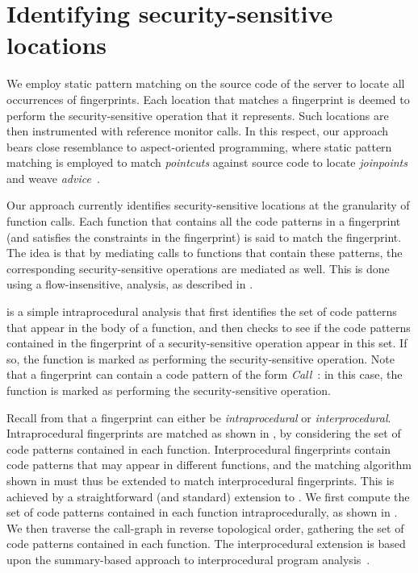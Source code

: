 \section{Identifying security-sensitive locations}
\label{chapter:matching:identifying}

We employ static pattern matching on the source code of the server to locate
all occurrences of fingerprints. Each location that matches a fingerprint is
deemed to perform the security-sensitive operation that it represents. Such
locations are then instrumented with reference monitor calls.  In this respect,
our approach bears close resemblance to aspect-oriented programming, where
static pattern matching is employed to match \textit{pointcuts} against source
code to locate \textit{joinpoints} and weave \textit{advice}~\cite{aosd}.

Our approach currently identifies security-sensitive locations at the
granularity of function calls. Each function that contains all the code
patterns in a fingerprint (and satisfies the constraints in the fingerprint)
is said to match the fingerprint. The idea is that by mediating calls to 
functions that contain these patterns, the corresponding security-sensitive 
operations are mediated as well.  This is done using a flow-insensitive, 
analysis, as described in . 

 is a simple intraprocedural analysis that
first identifies the set of code patterns that appear in the body of a
function, and then checks to see if the code patterns contained in the
fingerprint of a security-sensitive operation appear in this set. If so,
the function is marked as performing the security-sensitive operation.
Note that a fingerprint can contain a code pattern of the form
\textit{Call}~: in this case, the function  is marked
as performing the security-sensitive operation.

Recall from  that a fingerprint can
either be \textit{intraprocedural} or \textit{interprocedural}. Intraprocedural
fingerprints are matched as shown in , by
considering the set of code patterns contained in each function.
Interprocedural fingerprints contain code patterns that may appear in different
functions, and the matching algorithm shown in 
must thus be extended to match interprocedural fingerprints. This is achieved
by a straightforward (and standard) extension to
.  We first compute the set of code patterns
contained in each function intraprocedurally, as shown in
.  We then traverse the call-graph in reverse
topological order, gathering the set of code patterns contained in each
function. The interprocedural extension is based upon the summary-based
approach to interprocedural program analysis~\cite{sp81}.

